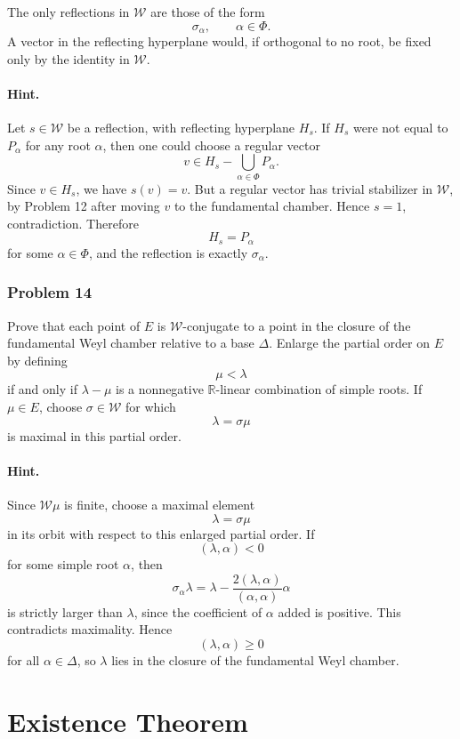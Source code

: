 \documentclass[12pt, a4paper]{article}
\begin{document}
The only reflections in \(\mathcal W\) are those of the form
\[
\sigma_\alpha,\qquad \alpha\in\Phi.
\]
A vector in the reflecting hyperplane would, if orthogonal to no root, be fixed
only by the identity in \(\mathcal W\).

\paragraph{Hint.}
Let \(s\in\mathcal W\) be a reflection, with reflecting hyperplane \(H_s\). If
\(H_s\) were not equal to \(P_\alpha\) for any root \(\alpha\), then one could
choose a regular vector
\[
v\in H_s-\bigcup_{\alpha\in\Phi}P_\alpha.
\]
Since \(v\in H_s\), we have \(s(v)=v\). But a regular vector has trivial
stabilizer in \(\mathcal W\), by Problem 12 after moving \(v\) to the
fundamental chamber. Hence \(s=1\), contradiction. Therefore
\[
H_s=P_\alpha
\]
for some \(\alpha\in\Phi\), and the reflection is exactly \(\sigma_\alpha\).

\subsubsection{Problem 14}

Prove that each point of \(E\) is \(\mathcal W\)-conjugate to a point in the
closure of the fundamental Weyl chamber relative to a base \(\Delta\). Enlarge
the partial order on \(E\) by defining
\[
\mu<\lambda
\]
if and only if \(\lambda-\mu\) is a nonnegative \(\mathbb R\)-linear
combination of simple roots. If \(\mu\in E\), choose \(\sigma\in\mathcal W\)
for which
\[
\lambda=\sigma\mu
\]
is maximal in this partial order.

\paragraph{Hint.}
Since \(\mathcal W\mu\) is finite, choose a maximal element
\[
\lambda=\sigma\mu
\]
in its orbit with respect to this enlarged partial order. If
\[
(\lambda,\alpha)<0
\]
for some simple root \(\alpha\), then
\[
\sigma_\alpha\lambda
=
\lambda-\frac{2(\lambda,\alpha)}{(\alpha,\alpha)}\alpha
\]
is strictly larger than \(\lambda\), since the coefficient of \(\alpha\) added
is positive. This contradicts maximality. Hence
\[
(\lambda,\alpha)\geq 0
\]
for all \(\alpha\in\Delta\), so \(\lambda\) lies in the closure of the
fundamental Weyl chamber.


\section{Existence Theorem}
\end{document}
